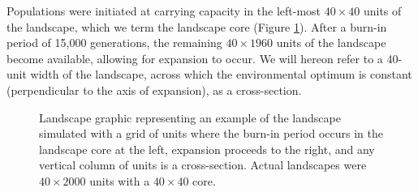 
Populations were initiated at carrying capacity in the left-most $40\times40$ units of the landscape, which we term the landscape core (Figure \ref{fig:landscape}). After a burn-in period of 15,000 generations, the remaining $40\times1960$ units of the landscape become available, allowing for expansion to occur. We will hereon refer to a 40-unit width of the landscape, across which the environmental optimum is constant (perpendicular to the axis of expansion), as a cross-section.

\begin{figure}[h]
\centering
{}
\caption[~- Landscape graphic.]{Landscape graphic representing an example of the landscape simulated with a grid of units where the burn-in period occurs in the landscape core at the left, expansion proceeds to the right, and any vertical column of units is a cross-section. Actual landscapes were $40\times2000$ units with a $40\times40$ core.}
\label{fig:landscape}
\end{figure}


